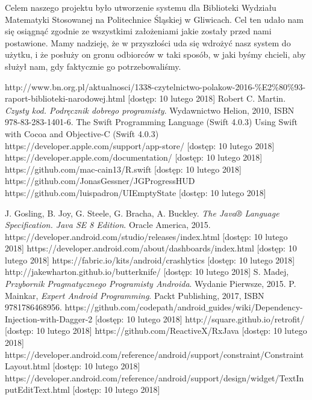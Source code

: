 \documentclass[twoside]{projektInzynierskiMS}
\begin{document}
Celem naszego projektu było utworzenie systemu dla Biblioteki Wydziału Matematyki Stosowanej na Politechnice Śląskiej w Gliwicach. Cel ten udało nam się osiągnąć zgodnie ze wszystkimi założeniami jakie zostały przed nami postawione. Mamy nadzieję, że w przyszłości uda się wdrożyć nasz system do użytku, i że posłuży on gronu odbiorców w taki sposób, w jaki byśmy chcieli, aby służył nam, gdy faktycznie go potrzebowaliśmy.


\begin{thebibliography}{12}

 http://www.bn.org.pl/aktualnosci/1338-czytelnictwo-polakow-2016-\%E2\%80\%93-raport-biblioteki-narodowej.html [dostęp: 10 lutego 2018]
Robert C. Martin. 
\textit{Czysty kod. Podręcznik dobrego programisty}. 
Wydawnictwo Helion, 2010, ISBN 978-83-283-1401-6.
 The Swift Programming Language (Swift 4.0.3)
 Using Swift with Cocoa and Objective-C (Swift 4.0.3)
 https://developer.apple.com/support/app-store/ [dostęp: 10 lutego 2018]
 https://developer.apple.com/documentation/ [dostęp: 10 lutego 2018]
 https://github.com/mac-cain13/R.swift [dostęp: 10 lutego 2018]
 https://github.com/JonasGessner/JGProgressHUD
 https://github.com/luispadron/UIEmptyState [dostęp: 10 lutego 2018]

 J. Gosling, B. Joy, G. Steele, G. Bracha, A. Buckley. \textit{The Java® Language Specification. Java SE 8 Edition}. Oracle America, 2015.
 https://developer.android.com/studio/releases/index.html [dostęp: 10 lutego 2018]
 https://developer.android.com/about/dashboards/index.html [dostęp: 10 lutego 2018]
 https://fabric.io/kits/android/crashlytics [dostęp: 10 lutego 2018]
 http://jakewharton.github.io/butterknife/ [dostęp: 10 lutego 2018]
 S. Madej, \textit{Przybornik Pragmatycznego Programisty
Androida}. Wydanie Pierwsze, 2015.
 P. Mainkar, \textit{Expert Android Programming}. Packt Publishing, 2017, ISBN 9781786468956.
 https://github.com/codepath/android$\_$guides/wiki/Dependency-Injection-with-Dagger-2 [dostęp: 10 lutego 2018]
 http://square.github.io/retrofit/ [dostęp: 10 lutego 2018]
 https://github.com/ReactiveX/RxJava [dostęp: 10 lutego 2018]
 https://developer.android.com/reference/android/support/constraint/ConstraintLayout.html [dostęp: 10 lutego 2018]
 https://developer.android.com/reference/android/support/design/widget/TextInputEditText.html [dostęp: 10 lutego 2018]

\end{thebibliography}
\end{document}
